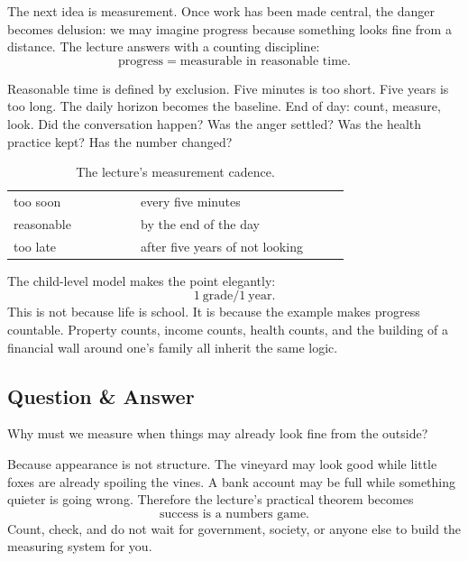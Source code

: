 The next idea is measurement. Once work has been made central, the danger becomes delusion: we may imagine progress because something looks fine from a distance. The lecture answers with a counting discipline:
\begin{equation}
\text{progress}=\text{measurable in reasonable time}.
\end{equation}

Reasonable time is defined by exclusion. Five minutes is too short. Five years is too long. The daily horizon becomes the baseline. End of day: count, measure, look. Did the conversation happen? Was the anger settled? Was the health practice kept? Has the number changed?

\begin{table}[h]
\centering
\begin{tabular}{p{0.28\linewidth} p{0.46\linewidth}}
too soon & every five minutes \\
reasonable & by the end of the day \\
too late & after five years of not looking
\end{tabular}
\caption{The lecture's measurement cadence.}
\end{table}

The child-level model makes the point elegantly:
\begin{equation}
1\ \text{grade} / 1\ \text{year}.
\end{equation}
This is not because life is school. It is because the example makes progress countable. Property counts, income counts, health counts, and the building of a financial wall around one's family all inherit the same logic.

\subsection{Question \& Answer}

Why must we measure when things may already look fine from the outside?

Because appearance is not structure. The vineyard may look good while little foxes are already spoiling the vines. A bank account may be full while something quieter is going wrong. Therefore the lecture's practical theorem becomes
\begin{equation}
\text{success is a numbers game}.
\end{equation}
Count, check, and do not wait for government, society, or anyone else to build the measuring system for you.

